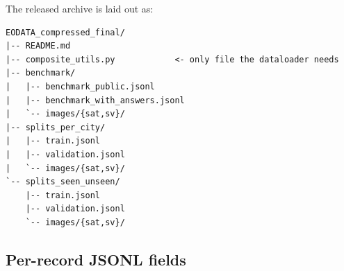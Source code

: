\documentclass[11pt,a4paper]{article}
\begin{document}
The released archive is laid out as:

\begin{lstlisting}
EODATA_compressed_final/
|-- README.md
|-- composite_utils.py            <- only file the dataloader needs
|-- benchmark/
|   |-- benchmark_public.jsonl
|   |-- benchmark_with_answers.jsonl
|   `-- images/{sat,sv}/
|-- splits_per_city/
|   |-- train.jsonl
|   |-- validation.jsonl
|   `-- images/{sat,sv}/
`-- splits_seen_unseen/
    |-- train.jsonl
    |-- validation.jsonl
    `-- images/{sat,sv}/
\end{lstlisting}

\subsection{Per-record JSONL fields}
\end{document}

